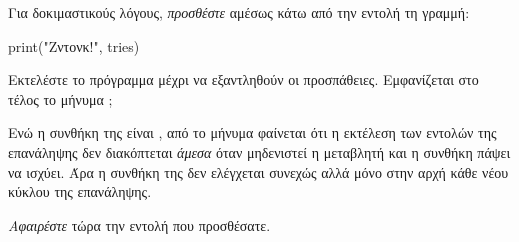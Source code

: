 \documentclass[a4paper,11pt,oneside]{book}
\begin{document}
\begin{step}
Για δοκιμαστικούς λόγους, \emph{προσθέστε} αμέσως κάτω από την εντολή  τη γραμμή:

\begin{pynew}
print("Ζντονκ!", tries)
\end{pynew}

Εκτελέστε το πρόγραμμα μέχρι να εξαντληθούν οι προσπάθειες. Eμφανίζεται στο τέλος το μήνυμα ;

\marginnote[14pt]{\icondiscuss}
\dottedline

Ενώ η συνθήκη της  είναι , από το μήνυμα φαίνεται ότι η εκτέλεση των εντολών της επανάληψης δεν διακόπτεται \emph{άμεσα} όταν μηδενιστεί η μεταβλητή  και η συνθήκη πάψει να ισχύει. Άρα η συνθήκη  της  δεν ελέγχεται συνεχώς αλλά μόνο στην αρχή κάθε νέου κύκλου της επανάληψης.

\emph{Αφαιρέστε} τώρα την εντολή που προσθέσατε.
\end{step}

\end{document}
